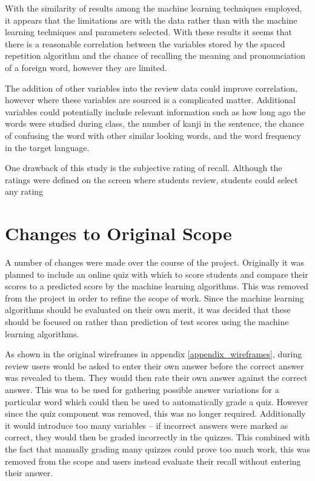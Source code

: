 With the similarity of results among the machine learning techniques employed, it
appears that the limitations are with the data rather than with the machine learning
techniques and parameters selected. With these results it seems that there is a
reasonable correlation
between the variables stored by the spaced repetition algorithm and the chance of
recalling the meaning and pronounciation of a foreign word, however they are limited.

The addition of other variables into the review data could improve correlation,
however where these variables are sourced is a complicated matter. Additional variables
could potentially include relevant information such as how long ago the words were studied
during class, the number of kanji in the sentence, the chance of confusing the word
with other similar looking words, and the word frequency in the target language.

One drawback of this study is the subjective rating of recall. Although the ratings
were defined on the screen where students review, students could select any rating

\section{Changes to Original Scope}
A number of changes were made over the course of the project. Originally it was
planned to include an online quiz with which to score students and compare their
scores to a predicted score by the machine learning algorithms. This was removed
from the project in order to refine the scope of work. Since the machine learning
algorithms should be evaluated on their own merit, it was decided that these should
be focused on rather than prediction of test scores using the machine learning
algorithms.

As shown in the original wireframes in appendix \ref{appendix_wireframes}, during review
users would be asked to enter their own answer before the correct answer was revealed
to them. They would then rate their own answer against the correct answer. This was
to be used for gathering possible answer variations for a particular word
which could then be used to automatically grade a quiz. However since the quiz
component was removed, this was no longer required. Additionally it would introduce
too many variables -- if incorrect answers were marked as correct, they would then
be graded incorrectly in the quizzes. This combined with the fact that manually
grading many quizzes could prove too much work, this was removed from the scope
and users instead evaluate their recall without entering their answer.

